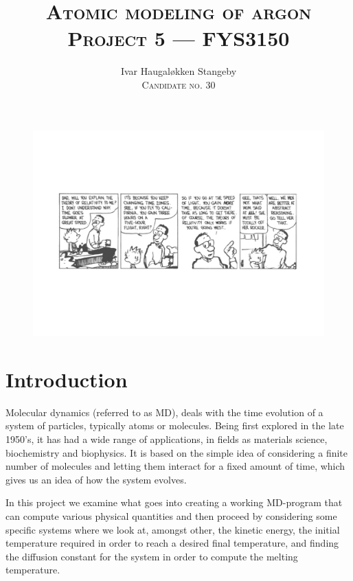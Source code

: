 \documentclass[a4paper]{article}
\title{%
    \textsc{Atomic modeling of argon}\\
    \footnotesize{\textsc{Project 5 --- FYS3150}}
}
\author{%
    Ivar Haugal{\o}kken Stangeby\\
    \footnotesize{\textsc{Candidate no. 30}}
}
\begin{document}
\maketitle    

\begin{figure}[h]
    \centering
    \includegraphics[width=\linewidth]{ch.pdf}
\end{figure}

\begin{abstract}
\end{abstract}
\tableofcontents
\section{Introduction}
\label{sec:introduction}
    Molecular dynamics (referred to as MD), deals with the time evolution of a
    system of particles, typically atoms or molecules. Being first explored in
    the late 1950's, it has had a wide range of applications, in fields as
    materials science, biochemistry and biophysics. It is based on the simple
    idea of considering a finite number of molecules and letting them interact
    for a fixed amount of time, which gives us an idea of how the system
    evolves. 

    In this project we examine what goes into creating a working MD-program
    that can compute various physical quantities and then proceed by
    considering some specific systems where we look at, amongst other, the
    kinetic energy, the initial temperature required in order to reach a
    desired final temperature, and finding the diffusion constant for the
    system in order to compute the melting temperature.
\end{document}

